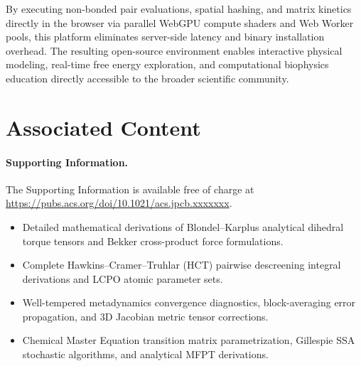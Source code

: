 \documentclass[journal=jpcbfk,manuscript=article,layout=twocolumn]{achemso}
\begin{document}
By executing non-bonded pair evaluations, spatial hashing, and matrix kinetics directly in the browser via parallel WebGPU compute shaders and Web Worker pools, this platform eliminates server-side latency and binary installation overhead. The resulting open-source environment enables interactive physical modeling, real-time free energy exploration, and computational biophysics education directly accessible to the broader scientific community.

\section*{Associated Content}

\paragraph{Supporting Information.}
The Supporting Information is available free of charge at \url{https://pubs.acs.org/doi/10.1021/acs.jpcb.xxxxxxx}.
\begin{itemize}
\item Detailed mathematical derivations of Blondel--Karplus analytical dihedral torque tensors and Bekker cross-product force formulations.
\item Complete Hawkins--Cramer--Truhlar (HCT) pairwise descreening integral derivations and LCPO atomic parameter sets.
\item Well-tempered metadynamics convergence diagnostics, block-averaging error propagation, and 3D Jacobian metric tensor corrections.
\item Chemical Master Equation transition matrix parametrization, Gillespie SSA stochastic algorithms, and analytical MFPT derivations.
\end{itemize}
\end{document}
